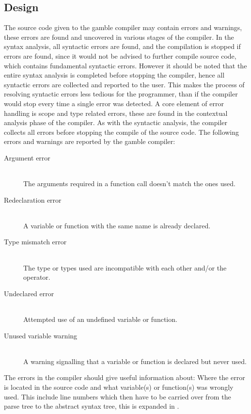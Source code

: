 \subsection*{Design}\label{subsec:DesignErrorHandling}
The source code given to the \gls{gamble} compiler may contain errors and warnings, these errors are found and uncovered in various stages of the compiler.   
In the syntax analysis, all syntactic errors are found, and the compilation is stopped if errors are found, since it would not be advised to further compile source code, which contains fundamental syntactic errors.
However it should be noted that the entire syntax analysis is completed before stopping the compiler, hence all syntactic errors are collected and reported to the user.
This makes the process of resolving syntactic errors less tedious for the programmer, than if the compiler would stop every time a single error was detected. 
A core element of error handling is scope and type related errors, these are found in the contextual analysis phase of the compiler.
As with the syntactic analysis, the compiler collects all errors before stopping the compile of the source code. 
The following errors and warnings are reported by the \gls{gamble} compiler:
\begin{description}
	\item[Argument error]\hfill\\ 
	The arguments required in a function call doesn't match the ones used.
	\item[Redeclaration error]\hfill\\ 
	A variable or function with the same name is already declared.
	\item[Type mismatch error]\hfill\\ 
	The type or types used are incompatible with each other and/or the operator. 
	\item[Undeclared error]\hfill\\ 
	Attempted use of an undefined variable or function.
	\item[Unused variable warning]\hfill\\ 
	A warning signalling that a variable or function is declared but never used.
\end{description} 
The errors in the compiler should give useful information about: Where the error is located in the source code and what variable(s) or function(s) was wrongly used.
This include line numbers which then have to be carried over from the parse tree to the abstract syntax tree, this is expanded in .

